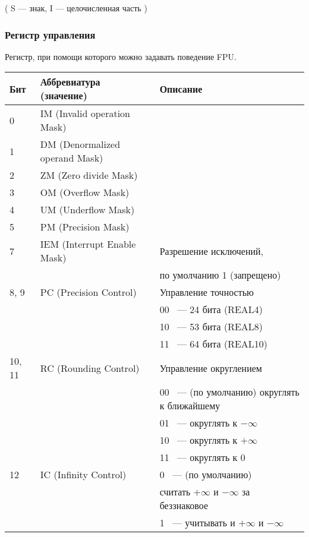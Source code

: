 \begin{center}
( S --- знак, I --- целочисленная часть )
\end{center}

\label{FPU_control_word}
\subsubsection{Регистр управления}

Регистр, при помощи которого можно задавать поведение \ac{FPU}.

\begin{center}
\begin{tabular}{ | l | l | l | }
\hline
Бит &
Аббревиатура (значение) &
Описание \\
\hline
0   & IM (Invalid operation Mask) & \\
\hline
1   & DM (Denormalized operand Mask) & \\
\hline
2   & ZM (Zero divide Mask) & \\
\hline
3   & OM (Overflow Mask) & \\
\hline
4   & UM (Underflow Mask) & \\
\hline
5   & PM (Precision Mask) & \\
\hline
7   & IEM (Interrupt Enable Mask) & Разрешение исключений, \\
    &                             & по умолчанию 1 (запрещено) \\
\hline
8, 9 & PC (Precision Control) & Управление точностью \\
     &                        & 00 ~--- 24 бита (REAL4) \\
     &                        & 10 ~--- 53 бита (REAL8) \\
     &                        & 11 ~--- 64 бита (REAL10) \\
\hline
10, 11 & RC (Rounding Control) & Управление округлением \\
       &                       & 00 ~--- (по умолчанию) округлять к ближайшему \\
       &                       & 01 ~--- округлять к $-\infty$ \\
       &                       & 10 ~--- округлять к $+\infty$ \\
       &                       & 11 ~--- округлять к 0 \\
\hline
12 & IC (Infinity Control) & 0 ~--- (по умолчанию) \\
   &                       & считать $+\infty$ и $-\infty$ за беззнаковое \\
   &                       & 1 ~--- учитывать и $+\infty$ и $-\infty$ \\
\hline
\end{tabular}
\end{center}

